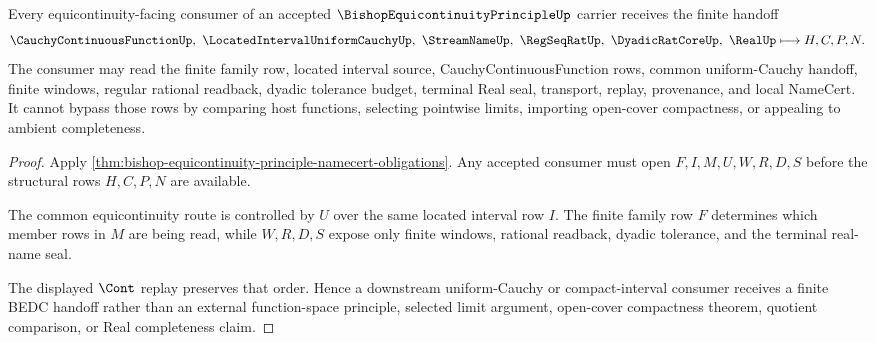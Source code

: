 \begin{theorem}
\label{thm:bishop-equicontinuity-principle-uniform-cauchy-handoff}
Every equicontinuity-facing consumer of an accepted $\BishopEquicontinuityPrincipleUp$ carrier receives the finite handoff
$$
\CauchyContinuousFunctionUp,\ \LocatedIntervalUniformCauchyUp,\ \StreamNameUp,\ \RegSeqRatUp,\ \DyadicRatCoreUp,\ \RealUp \longmapsto H,C,P,N .
$$
The consumer may read the finite family row, located interval source, CauchyContinuousFunction rows, common uniform-Cauchy handoff, finite windows, regular rational readback, dyadic tolerance budget, terminal Real seal, transport, replay, provenance, and local NameCert. It cannot bypass those rows by comparing host functions, selecting pointwise limits, importing open-cover compactness, or appealing to ambient completeness.
\end{theorem}
\begin{proof}
Apply \autoref{thm:bishop-equicontinuity-principle-namecert-obligations}. Any accepted consumer must open $F,I,M,U,W,R,D,S$ before the structural rows $H,C,P,N$ are available.

The common equicontinuity route is controlled by $U$ over the same located interval row $I$. The finite family row $F$ determines which member rows in $M$ are being read, while $W,R,D,S$ expose only finite windows, rational readback, dyadic tolerance, and the terminal real-name seal.

The displayed $\Cont$ replay preserves that order. Hence a downstream uniform-Cauchy or compact-interval consumer receives a finite BEDC handoff rather than an external function-space principle, selected limit argument, open-cover compactness theorem, quotient comparison, or Real completeness claim.
\end{proof}



